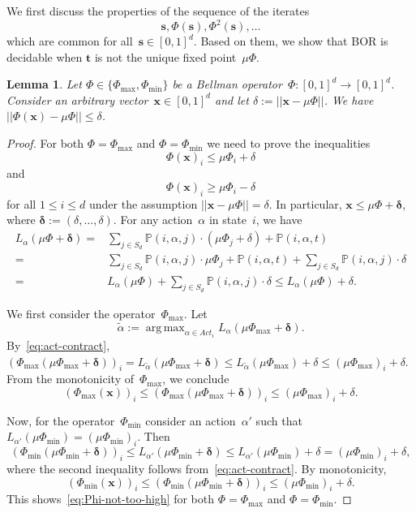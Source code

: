 \documentclass[preprint,12pt]{elsarticle}
\theoremstyle{plain}
\newtheorem{lemma}[theorem]{Lemma}
\theoremstyle{definition}
\theoremstyle{remark}
\theoremstyle{claimstyle}
\newcommand{\prob}{\mathbb{P}}
\DeclareMathOperator*{\argmax}{arg\,max}
\begin{document}
We first discuss the properties of the sequence of the iterates
\[\bm{s}, \Phi(\bm{s}), \Phi^2(\bm{s}), \dots\]
which are common for all~$\bm{s} \in [0,1]^d$. 
Based on them, we show that BOR is decidable when $\bm{t}$ is not the unique fixed point~$\mu\Phi$. 
\begin{lemma}\label{Phi-lip-like}
	Let $\Phi \in \{\Phi_{\max},\Phi_{\min}\}$ be a Bellman operator~$\Phi :[0, 1]^d\rightarrow [0, 1]^d$.
	Consider an arbitrary vector~$\bm{x} \in [0,1]^d$ and let
	$\delta:= ||\bm{x} - \mu\Phi||$.
	We have $||\Phi(\bm{x}) - \mu\Phi|| \leq \delta$.
\end{lemma}
\begin{proof}
	For both $\Phi = \Phi_{\max}$ and $\Phi = \Phi_{\min}$ we need to prove the inequalities
	\begin{equation} \label{eq:Phi-not-too-high}
		\Phi(\bm{x})_i \leq \mu\Phi_i + \delta
	\end{equation} and 
\begin{equation}\label{eq:Phi-not-too-low}
	\Phi(\bm{x})_i \geq \mu\Phi_i - \delta
\end{equation}
for all $1\leq i \leq d$ under the assumption $||\bm{x} - \mu\Phi|| = \delta$.
In particular, $\bm{x} \leq \mu\Phi + \bm{\delta}$, where $\bm{\delta} := (\delta, \dots, \delta)$.
For any action~$\alpha$ in state~$i$, we have
\begin{align}\label{eq:act-contract}
	L_{\alpha} (\mu\Phi + \bm{\delta})={} 
	&\sum_{j \in S_d} \prob(i,\alpha, j) \cdot (\mu\Phi_j + \delta) + \prob(i, \alpha, t)\nonumber \\
	={}&\sum_{j \in S_d} \prob(i,\alpha, j) \cdot \mu\Phi_j + \prob(i, \alpha, t) + \sum_{j \in S_d} \prob(i,\alpha, j) \cdot \delta  \nonumber \\
	={}&L_{\alpha}(\mu\Phi) +  \sum_{j \in S_d} \prob(i,\alpha, j) \cdot \delta \leq 
	L_{\alpha}(\mu\Phi) + \delta.
\end{align}

We first consider the operator~$\Phi_{\max}$.
Let \[\tilde{\alpha} := \argmax_{\alpha \in Act_i} L_\alpha(\mu\Phi_{\max} + \bm{\delta}).\] 
By~\eqref{eq:act-contract}, $(\Phi_{\max}(\mu\Phi_{\max} + \bm{\delta}))_i = L_{\tilde{\alpha}}(\mu\Phi_{\max} + \bm{\delta}) \leq L_{\tilde{\alpha}}(\mu\Phi_{\max}) + \delta \leq (\mu\Phi_{\max})_i + \delta$.
From the monotonicity of~$\Phi_{\max}$, we conclude \[(\Phi_{\max}(\bm{x}))_i \leq (\Phi_{\max}(\mu\Phi_{\max} + \bm{\delta}))_i \leq (\mu\Phi_{\max})_i + \delta.\]

Now, for the operator~$\Phi_{\min}$ consider an action~$\alpha'$ such that $L_{\alpha'}(\mu\Phi_{\min}) = (\mu\Phi_{\min})_i$. 
Then
\[(\Phi_{\min}(\mu\Phi_{\min}+\bm{\delta}))_i \leq L_{\alpha'} (\mu\Phi_{\min} + \bm{\delta}) \leq
L_{\alpha'}(\mu\Phi_{\min}) + \delta = (\mu\Phi_{\min})_i + \delta,\]
where the second inequality follows from~\eqref{eq:act-contract}.
By monotonicity, \[(\Phi_{\min}(\bm{x}))_i \leq (\Phi_{\min}(\mu\Phi_{\min}+\bm{\delta}))_i \leq (\mu\Phi_{\min})_i + \delta.\]
This shows~\cref{eq:Phi-not-too-high} for both $\Phi = \Phi_{\max}$ and $\Phi = \Phi_{\min}$.



\end{proof}
\end{document}
